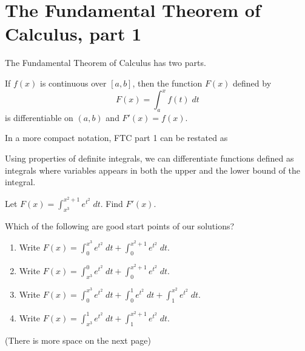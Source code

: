 \documentclass[../main.tex]{subfiles}
\begin{document}
 \section{The Fundamental Theorem of Calculus, part 1}
  The Fundamental Theorem of Calculus has two parts.

  \begin{mdframed}[style=withref-compact]
    If \(f(x)\) is continuous over \([a,b]\), then the function \(F(x)\) defined by
    \[
      F(x) = \int_{a}^{x} f(t) \;dt
    \]
    is differentiable on \((a,b)\) and \(F'(x) = f(x)\).

  \end{mdframed}

  In a more compact notation, FTC part 1 can be restated as 

  Using properties of definite integrals, we can differentiate functions defined as integrals where variables appears in both the upper and the lower bound of the integral.
  \begin{example} \label{ex:ftc-one}
    Let \(F(x) = \int_{x^{3}}^{x^{2} + 1} e^{t^{2}} \;dt\). Find \(F'(x)\).

    Which of the following are good start points of our solutions?
    \begin{enumerate}[label=(\alph*)]
      \item Write \(F(x) = \int_{0}^{x^{3}} e^{t^{2}} \;dt + \int_{0}^{x^{2}+1} e^{t^{2}} \;dt \).
      \item Write \(F(x) = \int_{x^{3}}^{0} e^{t^{2}} \;dt + \int_{0}^{x^{2}+1} e^{t^{2}} \;dt \).
      \item Write \(F(x) = \int_{0}^{x^{3}} e^{t^{2}} \;dt + \int_{0}^{1} e^{t^{2}} \;dt + \int_{1}^{x^{2}} e^{t^{2}} \;dt\).
      \item Write \(F(x) = \int_{x^{3}}^{1} e^{t^{2}} \;dt + \int_{1}^{x^{2}+1} e^{t^{2}} \;dt \).
    \end{enumerate}

    {\footnotesize (There is more space on the next page)}
  \end{example}
\end{document}
